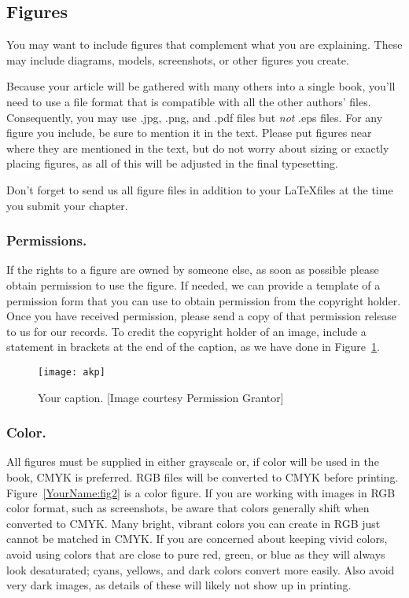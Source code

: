 \subsection{Figures}
You may want to include figures that complement what you are explaining. These may include diagrams, models, screenshots, or other figures you create.

Because your article will be gathered with many others into a single book, you'll need to use a file format that is compatible with all the other authors' files. Consequently, you may use .jpg, .png, and .pdf files but \emph{not} .eps files.
For any figure you include, be sure to mention it in the text.
Please put figures near where they are mentioned in the text, but do not worry about sizing or exactly placing figures, as all of this will be adjusted in the final typesetting.

Don't forget to send us all figure files in addition to your \LaTeX files at the time you submit your chapter.

\subsubsection{Permissions.}
If the rights to a figure are owned by someone else, as soon as possible please obtain permission to use the figure. If needed, we can provide a template of a permission form that you can use to obtain permission from the
copyright holder. Once you have received permission, please send a copy of that permission release to us for our records. To credit the copyright holder of an image, include a statement in brackets at the end of the caption, as we have done in Figure~\ref{YourName:fig1}.

\begin{figure}[htb]\centering
\texttt{[image: akp]}
\caption{Your caption. [Image courtesy Permission Grantor]}
\label{YourName:fig1}
\end{figure}

\subsubsection{Color.}
All figures must be supplied in either grayscale or, if color will be used in the book, CMYK is preferred. RGB files will be converted to CMYK before printing. Figure~\ref{YourName:fig2} is a color figure.
If you are working with images in RGB color format, such as screenshots, be aware that colors generally shift when converted to CMYK. Many bright, vibrant colors you can create in RGB just cannot be matched in CMYK. If you are concerned about keeping vivid colors, avoid using colors that are close to pure red, green, or blue as they will always look desaturated; cyans, yellows, and dark colors convert more easily. Also avoid very dark images, as details of these will likely not show up in printing.

